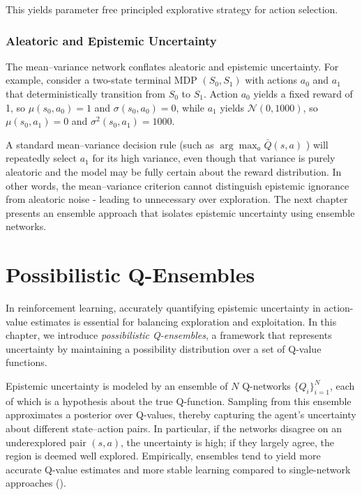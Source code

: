 \documentclass[11pt,a4paper]{report}
\begin{document}
This yields parameter free principled explorative strategy for action selection.


\subsection{Aleatoric and Epistemic Uncertainty}
The mean–variance network conflates aleatoric and epistemic uncertainty. For example, consider a two-state terminal MDP \((S_0,S_1)\) with actions \(a_0\) and \(a_1\) that deterministically transition from \(S_0\) to \(S_1\). Action \(a_0\) yields a fixed reward of 1, so \(\mu(s_0,a_0)=1\) and \(\sigma(s_0,a_0)=0\), while \(a_1\) yields \(\mathcal{N}(0,1000)\), so \(\mu(s_0,a_1)=0\) and \(\sigma^2(s_0,a_1)=1000\). \par A standard mean–variance decision rule (such as $\arg\max_{a} \bar{Q}(s, a)$ ) will repeatedly select \(a_1\) for its high variance, even though that variance is purely aleatoric and the model may be fully certain about the reward distribution. In other words, the mean–variance criterion cannot distinguish epistemic ignorance from aleatoric noise - leading to unnecessary over exploration. The next chapter presents an ensemble approach that isolates epistemic uncertainty using ensemble networks. 

\chapter{Possibilistic Q-Ensembles} \label{chapter:pqe}

In reinforcement learning, accurately quantifying epistemic uncertainty in action-value estimates is essential for balancing exploration and exploitation. In this chapter, we introduce \emph{possibilistic Q-ensembles}, a framework that represents uncertainty by maintaining a possibility distribution over a set of Q-value functions.

Epistemic uncertainty is modeled by an ensemble of \(N\) Q-networks \(\{Q_i\}_{i=1}^N\), each of which is a hypothesis about the true Q-function. Sampling from this ensemble approximates a posterior over Q-values, thereby capturing the agent’s uncertainty about different state–action pairs. In particular, if the networks disagree on an underexplored pair \((s,a)\), the uncertainty is high; if they largely agree, the region is deemed well explored. Empirically, ensembles tend to yield more accurate Q-value estimates and more stable learning compared to single-network approaches (\cite{Hans2010}).
\end{document}
